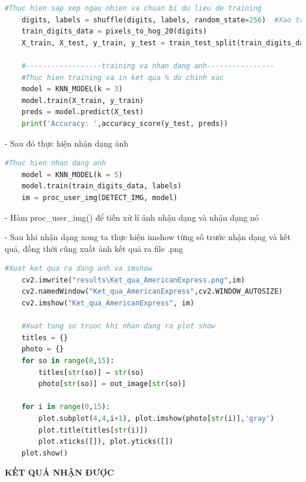 \begin{lstlisting}[language=Python]
    #Thuc hien sap xep ngau nhien va chuan bi du lieu de training
    digits, labels = shuffle(digits, labels, random_state=256)  #Xao tron du lieu
    train_digits_data = pixels_to_hog_20(digits)
    X_train, X_test, y_train, y_test = train_test_split(train_digits_data, labels, test_size=0.7)

    #------------------training va nhan dang anh----------------
    #Thuc hien training va in ket qua % do chinh xac
    model = KNN_MODEL(k = 3)
    model.train(X_train, y_train)
    preds = model.predict(X_test)
    print('Accuracy: ',accuracy_score(y_test, preds))
\end{lstlisting}

- Sau đó thực hiện nhận dạng ảnh
\begin{lstlisting}[language=Python]
    #Thuc hien nhan dang anh 
    model = KNN_MODEL(k = 5)
    model.train(train_digits_data, labels)
    im = proc_user_img(DETECT_IMG, model)
\end{lstlisting}

- Hàm proc\_user\_img() để tiền xử lí ảnh nhận dạng và nhận dạng nó

- Sau khi nhận dạng xong ta thực hiện imshow từng số trước nhận dạng và kết quả, đồng thời cũng xuất ảnh kết quả ra file .png
\begin{lstlisting}[language=Python]
    #Xuat ket qua ra dang anh va imshow
    cv2.imwrite("results\Ket_qua_AmericanExpress.png",im)
    cv2.namedWindow("Ket_qua_AmericanExpress",cv2.WINDOW_AUTOSIZE)
    cv2.imshow("Ket_qua_AmericanExpress", im)

    #Xuat tung so truoc khi nhan dang ra plot show
    titles = {}
    photo = {}
    for so in range(0,15):		
        titles[str(so)] = str(so)
        photo[str(so)] = out_image[str(so)]

    for i in range(0,15):
        plot.subplot(4,4,i+1), plot.imshow(photo[str(i)],'gray')
        plot.title(titles[str(i)])
        plot.xticks([]), plot.yticks([])
    plot.show()        
\end{lstlisting}

\quad \textbf{KẾT QUẢ NHẬN ĐƯỢC}

